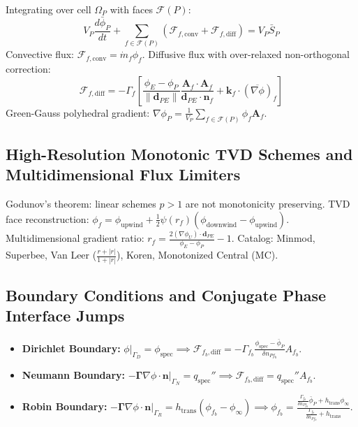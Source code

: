 \documentclass[11pt,a4paper]{article}
\begin{document}
Integrating over cell $\Omega_P$ with faces $\mathcal{F}(P)$:
\begin{equation}
V_P \frac{d\bar{\phi}_P}{dt} + \sum_{f \in \mathcal{F}(P)} \left( \mathcal{F}_{f, \text{conv}} + \mathcal{F}_{f, \text{diff}} \right) = V_P \bar{S}_P
\end{equation}
Convective flux: $\mathcal{F}_{f, \text{conv}} = \dot{m}_f \phi_f$. Diffusive flux with over-relaxed non-orthogonal correction:
\begin{equation}
\mathcal{F}_{f, \text{diff}} = -\Gamma_f \left[ \frac{\phi_E - \phi_P}{\|\mathbf{d}_{PE}\|} \frac{\mathbf{A}_f \cdot \mathbf{A}_f}{\mathbf{d}_{PE} \cdot \mathbf{n}_f} + \mathbf{k}_f \cdot (\overline{\nabla \phi})_f \right]
\end{equation}
Green-Gauss polyhedral gradient: $\nabla \phi_P = \frac{1}{V_P} \sum_{f \in \mathcal{F}(P)} \phi_f \mathbf{A}_f$.

\subsection{High-Resolution Monotonic TVD Schemes and Multidimensional Flux Limiters}

Godunov's theorem: linear schemes $p > 1$ are not monotonicity preserving.
TVD face reconstruction: $\phi_f = \phi_{\text{upwind}} + \frac{1}{2} \psi(r_f) (\phi_{\text{downwind}} - \phi_{\text{upwind}})$.
Multidimensional gradient ratio: $r_f = \frac{2 (\nabla \phi_U) \cdot \mathbf{d}_{PE}}{\phi_E - \phi_P} - 1$.
Catalog: Minmod, Superbee, Van Leer ($\frac{r+|r|}{1+|r|}$), Koren, Monotonized Central (MC).

\subsection{Boundary Conditions and Conjugate Phase Interface Jumps}

\begin{itemize}[leftmargin=*]
    \item \textbf{Dirichlet Boundary:} $\phi|_{\Gamma_D} = \phi_{\text{spec}} \implies \mathcal{F}_{f_b, \text{diff}} = -\Gamma_{f_b} \frac{\phi_{\text{spec}} - \bar{\phi}_P}{\delta n_{Pf_b}} A_{f_b}$.
    \item \textbf{Neumann Boundary:} $-\left. \boldsymbol{\Gamma} \nabla \phi \cdot \mathbf{n} \right|_{\Gamma_N} = q_{\text{spec}}'' \implies \mathcal{F}_{f_b, \text{diff}} = q_{\text{spec}}'' A_{f_b}$.
    \item \textbf{Robin Boundary:} $-\left. \boldsymbol{\Gamma} \nabla \phi \cdot \mathbf{n} \right|_{\Gamma_R} = h_{\text{trans}} (\phi_{f_b} - \phi_\infty) \implies \phi_{f_b} = \frac{\frac{\Gamma_{f_b}}{\delta n_{Pf_b}} \bar{\phi}_P + h_{\text{trans}} \phi_\infty}{\frac{\Gamma_{f_b}}{\delta n_{Pf_b}} + h_{\text{trans}}}$.
\end{itemize}
\end{document}
